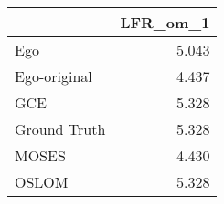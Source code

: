 \begin{tabular}{lr}
\toprule
{} & LFR_om_1 \\
\midrule
Ego          &    5.043 \\
Ego-original &    4.437 \\
GCE          &    5.328 \\
Ground Truth &    5.328 \\
MOSES        &    4.430 \\
OSLOM        &    5.328 \\
\bottomrule
\end{tabular}
